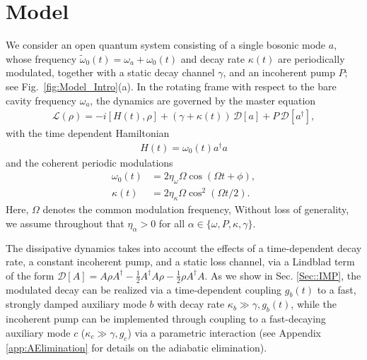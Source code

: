 \documentclass[a4paper,twocolumn,floatfix,10pt,superscriptaddress]%
{quantumarticle}
\newcommand{\mcrc}[1]{{\color{mcrcolor}{[MCR: #1]}}}
\newcommand{\mcl}[1]{\mathcal{#1}}
\newcommand{\mcL}{{\mcl{L}}}
\begin{document}
\section{Model} We consider an open quantum system consisting of a single bosonic mode $a$, whose frequency $\tilde{\omega}_0(t)=\omega_a+\omega_0(t)$ and decay rate $\kappa(t)$ are periodically modulated, together with a static decay channel $\gamma$, and an incoherent pump $P$; see Fig.~\ref{fig:Model_Intro}(a). In the rotating frame with respect to the bare cavity frequency $\omega_a$, the dynamics are governed by the master equation 
\begin{align}
\mcL(\rho) = -i[H(t), \rho] + (\gamma+\kappa(t))\, \mcl{D}[a]+ P\, \mcl{D}[a^\dag],
\end{align}
with the time dependent Hamiltonian 
\begin{align}
    H(t)=
    \omega_0(t)a^\dagger a
\end{align}
and the coherent periodic modulations 
\begin{align}
    \omega_0(t) &= 2 \eta_\omega \Omega \cos(\Omega t + \phi),\\\kappa(t)&=2\eta_\kappa \Omega \cos^2(\Omega t/2).
\end{align} Here, $\Omega$ denotes the common modulation frequency, \mcrc{whereas $\eta_\omega,$ and $\eta_\kappa$ are the modulation amplitudes for frequency and decay, respectively. For convenience, we also express the incoherent pump and the static decay gamma in terms of the modulation amplitude as $P=\eta_P \Omega$, and $\gamma=\eta_\gamma\Omega$.}
 Without loss of generality, we assume throughout that $\eta_\alpha>0$ for all $\alpha\in \{\omega, P, \kappa, \gamma\}$.

The dissipative dynamics takes into account the effects of a time-dependent decay rate, a constant incoherent pump, and a static loss channel, via a Lindblad term of the form $\mcl{D}[A] = A \rho A^\dag - \tfrac{1}{2} A^\dag A \rho - \tfrac{1}{2} \rho A^\dag A$. As we show in Sec. \ref{Sec::IMP}, the modulated decay can be realized via a time-dependent coupling $g_b(t)$ to a fast, strongly damped auxiliary mode $b$ with decay rate $\kappa_b \gg \gamma, g_b(t)$, while the incoherent pump can be implemented through coupling to a fast-decaying auxiliary mode $c$ ($\kappa_c \gg \gamma, g_c$) via a parametric interaction (see Appendix \ref{app:AElimination} for details on the adiabatic elimination).
 
\end{document}
